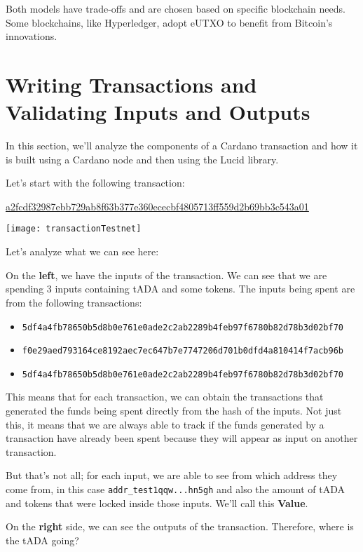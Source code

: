 Both models have trade-offs and are chosen based on specific blockchain needs. Some blockchains, like Hyperledger, adopt eUTXO to benefit from Bitcoin's innovations.


\section{Writing Transactions and Validating Inputs and Outputs}

In this section, we'll analyze the components of a Cardano transaction and how it is built using a Cardano node and then using the Lucid library.

Let's start with the following transaction:

\href{https://preview.cexplorer.io/tx/a2fcdf32987ebb729ab8f63b377e360ececbf4805713ff559d2b69bb3c543a01}{a2fcdf32987ebb729ab8f63b377e360ececbf4805713ff559d2b69bb3c543a01}

\texttt{[image: transactionTestnet]}

Let's analyze what we can see here:

On the \textbf{left}, we have the \gls{inputs} of the transaction. We can see that we are spending 3 inputs containing tADA and some tokens.
The inputs being spent are from the following transactions:

\begin{itemize}
    \item \texttt{5df4a4fb78650b5d8b0e761e0ade2c2ab2289b4feb97f6780b82d78b3d02bf70}
    \item \texttt{f0e29aed793164ce8192aec7ec647b7e7747206d701b0dfd4a810414f7acb96b}
    \item \texttt{5df4a4fb78650b5d8b0e761e0ade2c2ab2289b4feb97f6780b82d78b3d02bf70}
\end{itemize}

This means that for each transaction, we can obtain the transactions that generated the funds being spent directly from the hash of the inputs.
Not just this, it means that we are always able to track if the funds generated by a transaction have already been spent because they will appear as input on another transaction.

But that's not all; for each input, we are able to see from which address they come from, in this case \texttt{addr\_test1qqw...hn5gh} and also the amount of tADA and tokens that were locked inside those inputs. We'll call this \textbf{Value}.

On the \textbf{right} side, we can see the outputs of the transaction. Therefore, where is the tADA going?

